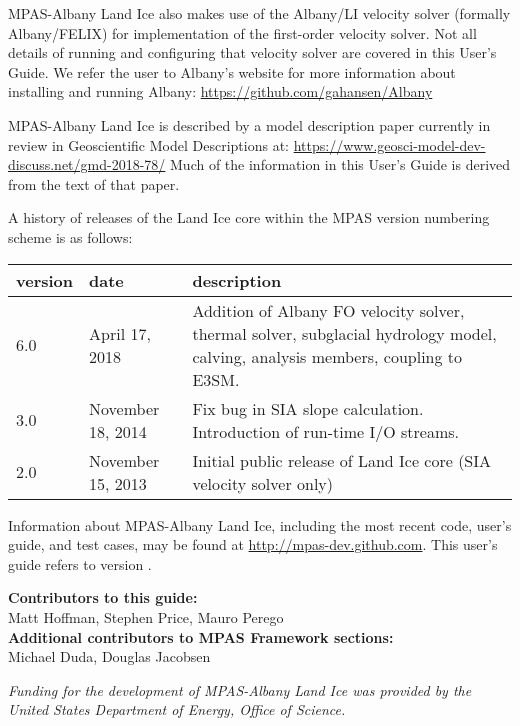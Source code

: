 MPAS-Albany Land Ice also makes use of the Albany/LI velocity solver (formally Albany/FELIX) for implementation of the first-order
velocity solver.  Not all details of running and configuring that velocity solver are covered in this User's Guide.  
We refer the user to Albany's website for more information about installing and running Albany: \url{https://github.com/gahansen/Albany}

MPAS-Albany Land Ice is described by a model description paper currently in review in Geoscientific Model Descriptions at:
\url{https://www.geosci-model-dev-discuss.net/gmd-2018-78/}
Much of the information in this User's Guide is derived from the text of that paper.


A history of releases of the Land Ice core within the MPAS version numbering scheme is as follows:

\begin{tabular}{p{1.5cm} p{3.7cm} p{10cm}} 
\hline\hline version & date & description  \\
\hline 
6.0 & April 17, 2018 & Addition of Albany FO velocity solver, thermal solver, subglacial hydrology model, calving, analysis members, coupling to E3SM.\\
\hline 
3.0 & November 18, 2014 & Fix bug in SIA slope calculation.  Introduction of run-time I/O streams. \\
\hline 
2.0 & November 15, 2013 & Initial public release of Land Ice core (SIA velocity solver only) \\
\hline 
\end{tabular} 

Information about MPAS-Albany Land Ice, including the most recent code, user's guide, and test cases, may be found at \url{http://mpas-dev.github.com}.  This user's guide refers to version \version.

\vspace{8pt}
\noindent
{\bf Contributors to this guide:}\\
Matt Hoffman, Stephen Price, Mauro Perego\\
{\bf Additional contributors to MPAS Framework sections:}\\
Michael Duda, Douglas Jacobsen

\vspace{8pt}
\noindent
{\it Funding for the development of MPAS-Albany Land Ice was provided by the United States Department of Energy, Office of Science.}




